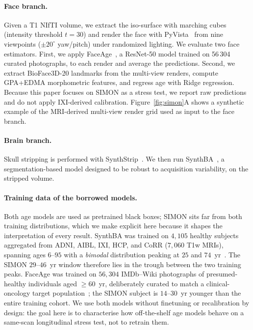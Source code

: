 \documentclass{midl} %
\begin{document}
\paragraph{Face branch.}
Given a T1 NIfTI volume, we extract the iso-surface with marching cubes
(intensity threshold $t{=}30$) and render the face with PyVista~\citep{pyvista}
from nine viewpoints ($\pm 20^\circ$ yaw/pitch) under randomized lighting.
We evaluate two face estimators.  First, we apply
FaceAge~\citep{bontempi2025faceage}, a ResNet-50 model trained on 56\,304
curated photographs, to each render and average the predictions.  Second,
we extract BioFace3D-20 landmarks from the multi-view renders, compute
GPA+EDMA morphometric features, and regress age with Ridge regression.
Because this paper focuses on SIMON as a stress test, we report raw
predictions and do not apply IXI-derived calibration.  Figure~\ref{fig:simon}A
shows a synthetic example of the MRI-derived multi-view render grid used as
input to the face branch.

\paragraph{Brain branch.}
Skull stripping is performed with SynthStrip~\citep{synthstrip}.  We then
run SynthBA~\citep{puglisi2024synthba}, a segmentation-based model designed
to be robust to acquisition variability, on the stripped volume.

\paragraph{Training data of the borrowed models.}
Both age models are used as pretrained black boxes; SIMON sits far from
both training distributions, which we make explicit here because it
shapes the interpretation of every result.  SynthBA was trained on
$4{,}105$ healthy subjects aggregated from ADNI, AIBL, IXI, HCP, and CoRR
($7{,}060$ T1w MRIs), spanning ages $6$--$95$ with a \emph{bimodal}
distribution peaking at $25$ and $74$~yr~\citep{puglisi2024synthba}.  The
SIMON $29$--$46$~yr window therefore lies in the trough between the two
training peaks.  FaceAge was trained on $56{,}304$ IMDb--Wiki photographs
of presumed-healthy individuals aged $\geq 60$~yr, deliberately curated to
match a clinical-oncology target population~\citep{bontempi2025faceage};
the SIMON subject is $14$--$30$~yr younger than the entire training
cohort.  We use both models without finetuning or recalibration by
design: the goal here is to characterise how off-the-shelf age models
behave on a same-scan longitudinal stress test, not to retrain them.
\end{document}
